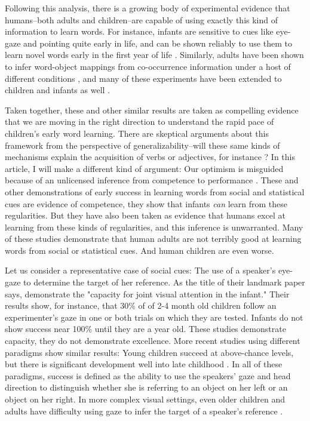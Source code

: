 \documentclass[review]{elsarticle}
\begin{document}
Following this analysis, there is a growing body of experimental evidence that humans--both adults and children--are capable of using exactly this kind of information to learn words. For instance, infants are sensitive to cues like eye-gaze and pointing quite early in life, and can be shown reliably to use them to learn novel words early in the first year of life \citep[e.g.][]{baldwin1993,corkum1998,scaife1975,tomasello2007}. Similarly, adults have been shown to infer word-object mappings from co-occurrence information under a host of different conditions \cite[e.g.][]{vouloumanos2008,yurovsky2013, yu2007}, and many of these experiments have been extended to children and infants as well \citep{smith2008,suanda2014,vouloumanos2009}.

Taken together, these and other similar results are taken as compelling evidence that we are moving in the right direction to understand the rapid pace of children's early word learning. There are skeptical arguments about this framework from the perspective of generalizability--will these same kinds of mechanisms explain the acquisition of verbs or adjectives, for instance \citep[c.f.][]{scott2012}? In this article, I will make a different kind of argument: Our optimism is misguided because of an unlicensed inference from competence to performance \citep{chomsky1965}. These and other demonstrations of early success in learning words from social and statistical cues are evidence of competence, they show that infants \emph{can} learn from these regularities. But they have also been taken as evidence that humans excel at learning from these kinds of regularities, and this inference is unwarranted. Many of these studies demonstrate that human adults are not terribly good at learning words from social or statistical cues. And human children are even worse. 

Let us consider a representative case of social cues: The use of a speaker's eye-gaze to determine the target of her reference. As the title of their landmark paper says, \cite{scaife1975} demonstrate the "capacity for joint visual attention in the infant." Their results show, for instance, that 30\% of of 2-4 month old children follow an experimenter's gaze in one or both trials on which they are tested. Infants do not show success near 100\% until they are a year old. These studies demonstrate capacity, they do not demonstrate excellence. More recent studies using different paradigms show similar results: Young children succeed at above-chance levels, but there is significant development well into late childhood \citep{hollich2000,moore1999,yurovsky2013online,yurovsky2015beyond}. In all of these paradigms, success is defined as the ability to use the speakers' gaze and head direction to distinguish whether she is referring to an object on her left or an object on her right. In more complex visual settings, even older children and adults have difficulty using gaze to infer the target of a speaker's reference \citep{loomis2008,vida2012}.
\end{document}
